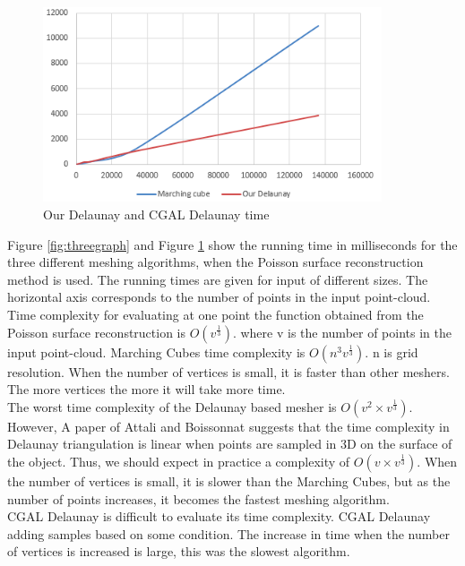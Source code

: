 \documentclass{article}
\begin{document}
\begin{figure}[h]
\begin{center}
\caption{Our Delaunay and CGAL Delaunay time}
 \label{fig:twograph}
\includegraphics[width=10cm]{marching_and_delaunay_timegraph.png}

\end{center}
\end{figure}
Figure \ref{fig:threegraph} and Figure \ref{fig:twograph} show the running time in milliseconds for the three different meshing algorithms, when the Poisson surface reconstruction method is used. The running times are given for input of different sizes. The horizontal axis corresponds to the number of points in the input point-cloud.\\
Time complexity for evaluating at one point the function obtained from the Poisson surface reconstruction is  $O(v^{\frac{1}{3} }) $. where v is the number of points in the input point-cloud. 
Marching Cubes time complexity is $O(n^3 v^{\frac{1}{3} })$. n is grid resolution. When the number of vertices is small, it is faster than other meshers. The more vertices the more it will take more time.\\
The worst time complexity of the Delaunay based mesher is $O(v^2\times v^{ \frac{1}{3} })$. However, A paper of Attali and Boissonnat \cite{ourDelaunay2} suggests that the time complexity in Delaunay triangulation is linear when points are sampled in 3D on the surface of the object. Thus, we should expect in practice a complexity of $O(v\times v^{ \frac{1}{3} })$. When the number of vertices is small, it is slower than the Marching Cubes, but as the number of points increases, it becomes the fastest meshing algorithm.\\
CGAL Delaunay is difficult to evaluate its time complexity. CGAL Delaunay adding samples based on some condition.  The increase in time when the number of vertices is increased is large, this was the slowest algorithm.
\end{document}
